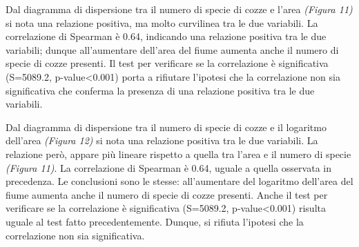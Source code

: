 \documentclass{article} %
\begin{document}
Dal diagramma di dispersione tra il numero di specie di cozze e l'area \textit{(Figura 11)} si nota una relazione positiva, ma molto curvilinea tra le due variabili.  
La correlazione di Spearman è 0.64, indicando una relazione positiva tra le due variabili; dunque all'aumentare dell'area del fiume aumenta anche il numero di specie di cozze presenti.
Il test per verificare se la correlazione è significativa (S=5089.2, p-value<0.001) porta a rifiutare l'ipotesi che la correlazione non sia significativa che conferma la presenza di una relazione positiva tra le due variabili.

Dal diagramma di dispersione tra il numero di specie di cozze e il logaritmo dell'area \textit{(Figura 12)} si nota una relazione positiva tra le due variabili. La relazione però, appare più lineare rispetto a quella tra l'area e il numero di specie \textit{(Figura 11)}.  
La correlazione di Spearman è 0.64, uguale a quella osservata in precedenza. Le conclusioni sono le stesse: all'aumentare del logaritmo dell'area del fiume aumenta anche il numero di specie di cozze presenti.
Anche il test per verificare se la correlazione è significativa (S=5089.2, p-value<0.001) risulta uguale al test fatto precedentemente. Dunque, si rifiuta l'ipotesi che la correlazione non sia significativa.
\end{document}
